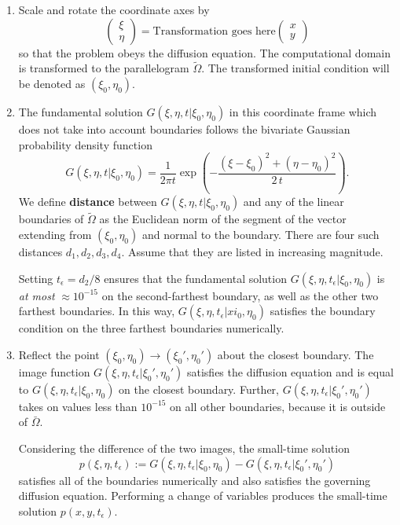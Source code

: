 \documentclass[10pt]{article}
\begin{document}
\begin{enumerate}[1.]
\item Scale and rotate the coordinate axes by
  \[
    \left( \begin{array}{c}
             \xi \\
             \eta
           \end{array} \right) = \mbox{Transformation goes here}
             \left( \begin{array}{cc}
             x \\
             y
           \end{array} \right) 
       \]
       so that the problem obeys the diffusion equation. The
       computational domain is transformed to the parallelogram
       $\tilde{\Omega}$. The transformed initial condition will be
       denoted as $(\xi_0, \eta_0)$.

     \item The fundamental solution $G(\xi,\eta,t | \xi_0, \eta_0)$ in
       this coordinate frame which does not take into account
       boundaries follows the bivariate Gaussian probability density
       function
  \[
    G(\xi,\eta,t | \xi_0, \eta_0) = \frac{1}{2\pi t} \exp\left(-\frac{(\xi-\xi_0)^2 +
        (\eta-\eta_0)^2}{2\,t} \right).
  \]
  We define \textbf{distance} between $G(\xi,\eta,t | \xi_0, \eta_0)$
  and any of the linear boundaries of $\tilde{\Omega}$ as the
  Euclidean norm of the segment of the vector extending from
  $(\xi_0,\eta_0)$ and normal to the boundary. There are four such
  distances $d_1, d_2, d_3, d_4$. Assume that they are listed in
  increasing magnitude.

  Setting $t_\epsilon = d_2/8$ ensures that the fundamental solution
  $G(\xi,\eta,t_\epsilon | \xi_0, \eta_0)$ is \textit{at most}
  $\approx 10^{-15}$ on the second-farthest boundary, as well as the
  other two farthest boundaries. In this way,
  $G(\xi,\eta,t_\epsilon | xi_0, \eta_0)$ satisfies the boundary
  condition on the three farthest boundaries numerically.

\item Reflect the point $(\xi_0, \eta_0) \to (\xi_0', \eta_0')$ about
  the closest boundary. The image function
  $G(\xi,\eta,t_\epsilon | \xi_0', \eta_0')$ satisfies the diffusion
  equation and is equal to $G(\xi,\eta,t_\epsilon | \xi_0, \eta_0)$ on
  the closest boundary. Further,
  $G(\xi,\eta,t_\epsilon | \xi_0', \eta_0')$ takes on values less than
  $10^{-15}$ on all other boundaries, because it is outside of
  $\bar{\Omega}$.

  Considering the difference of the two images, the small-time solution 
  \[
    p(\xi,\eta,t_\epsilon) := G(\xi,\eta,t_\epsilon | \xi_0, \eta_0) -
    G(\xi,\eta,t_\epsilon | \xi_0', \eta_0')
  \]
  satisfies all of the boundaries numerically and also satisfies the
  governing diffusion equation. Performing a change of variables
  produces the small-time solution $p(x,y,t_\epsilon)$.
\end{enumerate}
\end{document}
